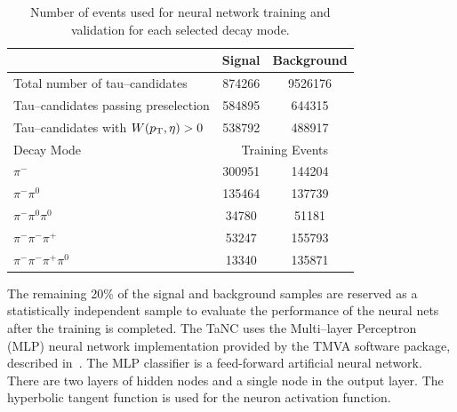 \begin{table}
   \centering
   \begin{tabular}{lcc}
                                                & Signal        & Background    \\
      \hline
      Total number of tau--candidates           & 874266        & 9526176       \\
      Tau--candidates passing preselection      & 584895        & 644315        \\
      Tau--candidates with $W(p_{\mathrm{T}},\eta)>0$      & 538792        & 488917        \\
      \hline
      Decay Mode                        & \multicolumn{2}{c}{Training Events}   \\
      \hline
      $\pi^{-}$                         & 300951   & 144204                     \\
      $\pi^{-}\pi^0$                    & 135464   & 137739                     \\
      $\pi^{-}\pi^0\pi^0$               & 34780    & 51181                      \\
      $\pi^{-}\pi^{-}\pi^{+}$           & 53247    & 155793                     \\
      $\pi^{-}\pi^{-}\pi^{+}\pi^0$      & 13340    & 135871                     \\
   \end{tabular}
   \label{tab:trainingEvents} \caption[Neural network training event
   statistics]{Number of events used for neural network training and validation
   for each selected decay mode.}
\end{table}

The remaining 20\% of the signal and background samples are
reserved as a statistically independent sample to evaluate the performance of
the neural nets after the training is completed.  The TaNC uses the Multi--layer
Perceptron (MLP)
neural network implementation provided by the TMVA software package, described
in~\cite{TMVA}.  The MLP classifier is a feed-forward artificial neural
network. There are two layers of hidden nodes and a single node in the output
layer.  The hyperbolic tangent function is used for the neuron activation
function.  

